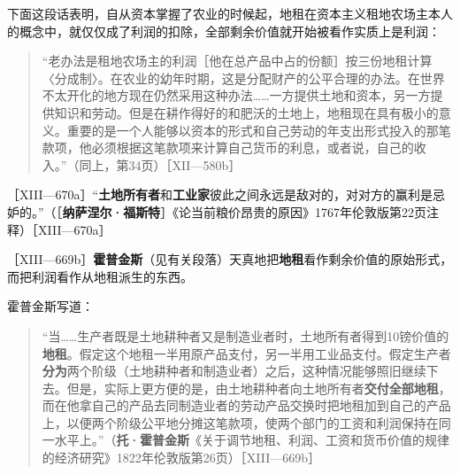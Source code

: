 下面这段话表明，自从资本掌握了农业的时候起，地租在资本主义租地农场主本人的概念中，就仅仅成了利润的扣除，全部剩余价值就开始被看作实质上是利润：

\begin{quote}{“老办法是租地农场主的利润［他在总产品中占的份额］按三份地租计算〈分成制〉。在农业的幼年时期，这是分配财产的公平合理的办法。在世界不太开化的地方现在仍然采用这种办法……一方提供土地和资本，另一方提供知识和劳动。但是在耕作得好的和肥沃的土地上，地租现在具有极小的意义。重要的是一个人能够以资本的形式和自己劳动的年支出形式投入的那笔款项，他必须根据这笔款项来计算自己货币的利息，或者说，自己的收入。”（同上，第34页）［XII—580b］}\end{quote}


［XIII—670a］“\textbf{土地所有者}和\textbf{工业家}彼此之间永远是敌对的，对对方的赢利是忌妒的。”（［\textbf{纳萨涅尔·福斯特}］《论当前粮价昂贵的原因》1767年伦敦版第22页注释）［XIII—670a］


［XIII—669b］\textbf{霍普金斯}（见有关段落）天真地把\textbf{地租}看作剩余价值的原始形式，而把利润看作从地租派生的东西。

霍普金斯写道：

\begin{quote}{“当……生产者既是土地耕种者又是制造业者时，土地所有者得到10镑价值的\textbf{地租}。假定这个地租一半用原产品支付，另一半用工业品支付。假定生产者\textbf{分为}两个阶级（土地耕种者和制造业者）之后，这种情况能够照旧继续下去。但是，实际上更方便的是，由土地耕种者向土地所有者\textbf{交付全部地租}，而在他拿自己的产品去同制造业者的劳动产品交换时把地租加到自己的产品上，以便两个阶级公平地分摊这笔款项，使两个部门的工资和利润保持在同一水平上。”（\textbf{托·霍普金斯}《关于调节地租、利润、工资和货币价值的规律的经济研究》1822年伦敦版第26页）［XIII—669b］}\end{quote}


